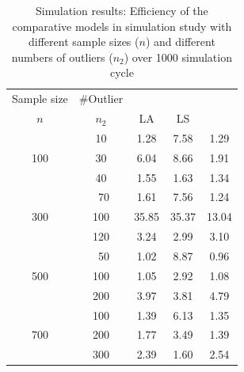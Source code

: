 \documentclass{IJFS}
\begin{document}
\begin{table}[t]
\caption{Simulation results: Efficiency of the  comparative models in simulation study with different sample sizes ($n$) and different numbers of outliers ($n_2$) over 1000 simulation cycle}
\label{Result05}
\centering
\begin{tabular}{ccccc}
\hline
 Sample size  & \#Outlier&       &         &                       \\
$n$           &$n_2$ &   LA      & LS      &    \cite{Cha19}  \\
\hline
              &  10  &    1.28   &    7.58 &        1.29             \\
100           &  30  &    6.04   &    8.66 &        1.91    \\
              &  40  &    1.55   &    1.63 &        1.34      \\
\hline
              & ~70  &    1.61   &    7.56 &        1.24     \\
300           & 100  &   35.85   &   35.37 &       13.04     \\
              & 120  &    3.24   &    2.99 &        3.10             \\
\hline
              & ~50  &   1.02    &    8.87 &        0.96        \\
500           & 100  &   1.05    &    2.92 &        1.08           \\
              & 200  &   3.97    &    3.81 &        4.79               \\
\hline
              & 100  &  1.39     &    6.13 &        1.35      \\
700           & 200  &  1.77     &    3.49 &        1.39         \\
              & 300  &  2.39     &    1.60 &        2.54           \\
\hline
\end{tabular}
\end{table}
\end{document}
